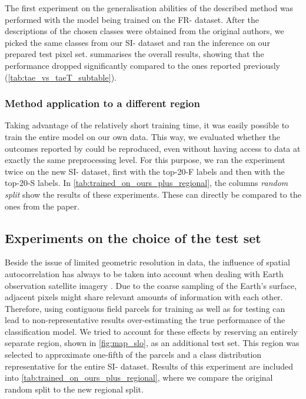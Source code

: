 \figDatasetStatistics

The first experiment on the generalisation abilities of the described method was performed with the model being trained on the FR- dataset.
After the descriptions of the chosen classes were obtained from the original authors, we picked the same classes from our SI- dataset and ran the inference on our prepared test pixel set.
 summarises the overall results, showing that the performance dropped significantly compared to the ones reported previously (\cf \cref{tab:tae_vs_taeT_subtable}).


\subsubsection{Method application to a different region}

\tabResultsTrainedRegional

Taking advantage of the relatively short training time, it was easily possible to train the entire model on our own data.
This way, we evaluated whether the outcomes reported by \citeauthor{Garnot20:SIT} could be reproduced, even without having access to data at exactly the same preprocessing level.
For this purpose, we ran the experiment twice on the new SI- dataset, \ie first with the top-20-F labels and then with the top-20-S labels.
In \cref{tab:trained_on_ours_plus_regional}, the columns \emph{random split} show the results of these experiments.
These can directly be compared to the ones from the paper.

\subsection{Experiments on the choice of the test set} \label{sec:testset}

Beside the issue of limited geometric resolution in \sentinel data, the influence of spatial autocorrelation has always to be taken into account when dealing with Earth observation satellite imagery \parencite{Spiker07:SSA}.
Due to the coarse sampling of the Earth's surface, adjacent pixels might share relevant amounts of information with each other.
Therefore, using contiguous field parcels for training as well as for testing can lead to non-representative results over-estimating the true performance of the classification model.
We tried to account for these effects by reserving an entirely separate region, shown in \cref{fig:map_slo}, as an additional test set.
This region was selected to approximate one-fifth of the parcels and a class distribution representative for the entire SI- dataset.
Results of this experiment are included into \cref{tab:trained_on_ours_plus_regional}, where we compare the original random split to the new regional split.


